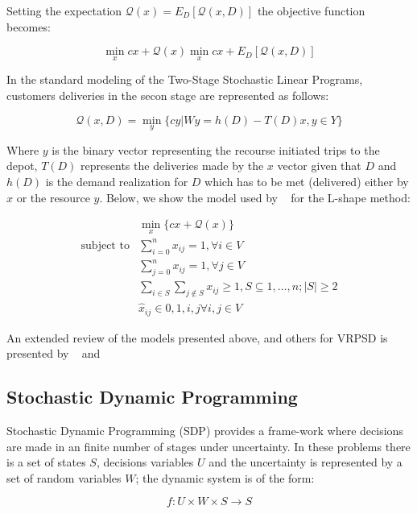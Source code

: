 Setting the expectation $\mathcal{Q}(x) = E_D[\mathcal{Q}(x,D)]$ the objective function becomes:

\begin{equation}\label{eq:SPR_objective}
 \min\limits_x{cx+\mathcal{Q}(x)} \min\limits_x{cx+E_D[\mathcal{Q}(x,D)]}
\end{equation}

In the standard modeling of the Two-Stage Stochastic Linear Programs, customers deliveries in the secon stage are represented as follows:

\begin{equation}\label{eq:SPR_second_stage}
 \mathcal{Q}(x,D)=\min\limits_y\{cy|Wy=h(D)-T(D)x, y \in Y\}
\end{equation}

Where $y$ is the binary vector representing the recourse initiated trips to the depot, $T(D)$ represents the deliveries made by the $x$ vector given that $D$ and $h(D)$ is the demand realization for $D$ which has to be met (delivered) either by $x$ or the resource $y$. Below, we show the model used by ~\cite{laporte_integer_2002} for the L-shape method:

\begin{align}\label{eq:SPR_lshape}
  & \min\limits_{x} \{cx+\mathcal{Q}(x)\}\\ 
 \text{subject to} & \sum_{i=0}^nx_{ij} = 1, \forall i \in V\\
  & \sum_{j=0}^nx_{ij} = 1, \forall j \in V\\
  & \sum_{i\in S}\sum_{j\notin S}x_{ij} \geq 1, S\subseteq {1,\ldots,n};|S|\geq2\\
  & \hat{x}_{ij} \in {0,1}, i,j \forall i,j \in V
\end{align}

An extended review of the models presented above, and others for VRPSD is presented by ~\cite{Dror_2005} and ~\cite{Dror1993432}

\subsection{Stochastic Dynamic Programming}

Stochastic Dynamic Programming (SDP) provides a frame-work where decisions are made in an finite number of stages under uncertainty. In these problems there is a set of states $S$, decisions variables $U$ and the uncertainty is represented by a set of random variables $W$; the dynamic system is of the form:

\[f: U\times W \times S \rightarrow S\]


